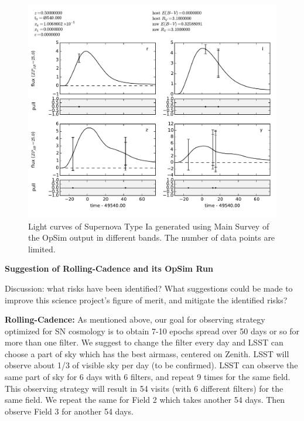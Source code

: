 \begin{figure}[tbh!]
\includegraphics[angle=0,width=0.99\hsize:,clip]{figs/SN_309_lc.pdf}
\caption{Light curves of Supernova Type Ia generated using Main Survey of the OpSim output in different bands. The number of data points are limited. 
}
\label{fig:SNIaLCopsimmain}
\end{figure}







{\bf Suggestion of Rolling-Cadence and its OpSim Run}

Discussion: what risks have been identified? What suggestions could be
made to improve this science project's figure of merit, and mitigate
the identified risks?

{\bf Rolling-Cadence:} As mentioned above, our goal for observing strategy optimized for SN cosmology
is to obtain 7-10 epochs spread over 50 days or so for more than one filter. We suggest to change the filter 
every day and LSST can choose a part of sky which has the best airmass, centered on Zenith.
LSST will observe about 1/3 of visible sky per day (to be confirmed). LSST can observe the same part of sky for 6 days 
with 6 filters, and repeat 9 times for the same field. This observing strategy will result in 54 visits (with 6 different filters) for the same field. We repeat the same for Field 2 which takes another 54 days. Then observe Field 3 for another 54 days.

